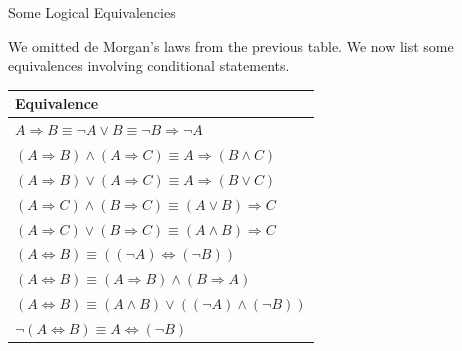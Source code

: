\documentclass[smaller,hyperref={CJKbookmarks=true}]{beamer}
\begin{document}
\begin{frame}{Some Logical Equivalencies}
\begin{spacing}{1.05}
\newpage
We omitted de Morgan's laws from the previous table. We now list some
equivalences involving conditional statements.
\begin{center}
  \begin{tabular}{l}
   \toprule
    Equivalence \\ \midrule
    $A\Rightarrow B\equiv\neg A\vee B\equiv\neg B\Rightarrow\neg A$ \\ \midrule
    $(A\Rightarrow B)\wedge(A\Rightarrow C)\equiv A\Rightarrow(B\wedge C)$ \\
    $(A\Rightarrow B)\vee(A\Rightarrow C)\equiv A\Rightarrow(B\vee C)$ \\ \midrule
    $(A\Rightarrow C)\wedge(B\Rightarrow C)\equiv(A\vee B)\Rightarrow C$ \\
    $(A\Rightarrow C)\vee(B\Rightarrow C)\equiv(A\wedge B)\Rightarrow C$  \\ \midrule
    $(A\Leftrightarrow B)\equiv((\neg A)\Leftrightarrow(\neg B))$ \\
    $(A\Leftrightarrow B)\equiv(A\Rightarrow B)\wedge(B\Rightarrow A)$ \\
    $(A\Leftrightarrow B)\equiv(A\wedge B)\vee((\neg A)\wedge(\neg B))$ \\
    $\neg(A\Leftrightarrow B)\equiv A\Leftrightarrow(\neg B)$ \\
    \bottomrule
  \end{tabular}
\end{center}
\end{spacing}
\end{frame}
\end{document}
